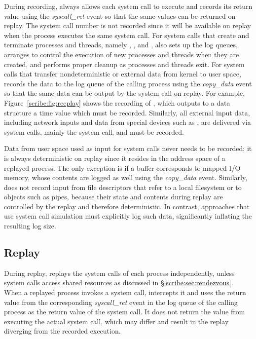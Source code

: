 During recording, \scribe{} always allows each system call to execute
and records its return value using the {\em syscall\_ret} event so
that the same values can be returned on replay.  The system call
number is not recorded since it will be available on replay when the
process executes the same system call.  
For system calls that create and terminate processes and threads,
namely , , and , \scribe{} also sets
up the log queues, arranges to control the execution of new processes
and threads when they are created, and performs proper cleanup as
processes and threads exit.
For system calls that transfer nondeterministic or external data from
kernel to user space, \scribe{} records the data to the log
queue of the calling process using the {\em copy\_data} event
so that the same data can be output by the system call on replay.
For example, Figure~\ref{scribe:fig:recplay} shows the recording of
, which outputs to a data structure a time value
which must be recorded. Similarly, all external input data, including
network inputs and data from special devices such
as , are delivered via system calls, mainly
the  system call, and must be recorded.

Data from user space used as input for system calls never
needs to be recorded; it is always deterministic on replay since it
resides in the address space of a replayed process. The only exception
is if a buffer corresponds to mapped I/O memory, whose
contents are logged as well using the {\em copy\_data}
event. Similarly, \scribe{} does not record input from file
descriptors that refer to a local filesystem or to objects such as
pipes, because their state and contents during replay are controlled
by the replay and therefore deterministic.  In contrast, approaches
that use system call simulation must explicitly log such data,
significantly inflating the resulting log size. 

\subsection{Replay}

During replay, \scribe{} replays the system calls of each process
independently, unless system calls access shared resources as discussed
in \S\ref{scribe:sec:rendezvous}.  When a replayed process invokes a
system call, \scribe{} intercepts it and uses the return value from the
corresponding {\em syscall\_ret} event in the log queue of the calling
process as the return value of the system call.  It does not return
the value from executing the actual system call, which may differ and
result in the replay diverging from the recorded execution. 

